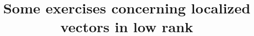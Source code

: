 \documentclass[reqno]{amsart} 
\title{Some exercises concerning localized vectors in low rank}
\numberwithin{equation}{section}
\numberwithin{theorem}{section}
\begin{document}
{} 
\end{document}
